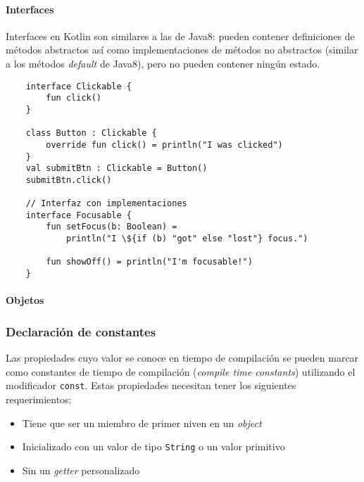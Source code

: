 \paragraph{Interfaces}
Interfaces en Kotlin son similares a las de Java8: pueden contener definiciones de métodos abstractos así como implementaciones de métodos no abstractos (similar a los métodos \emph{default} de Java8), pero no pueden contener ningún estado.
\begin{verbatim}
    interface Clickable {
        fun click()
    }
    
    class Button : Clickable {
        override fun click() = println("I was clicked")
    }
    val submitBtn : Clickable = Button()
    submitBtn.click() 
    
    // Interfaz con implementaciones
    interface Focusable {
        fun setFocus(b: Boolean) = 
            println("I \${if (b) "got" else "lost"} focus.")
            
        fun showOff() = println("I'm focusable!")            
    }
\end{verbatim}


\paragraph{Objetos}



%


\subsubsection{Declaración de constantes}
Las propiedades cuyo valor se conoce en tiempo de compilación se pueden marcar como constantes de tiempo de compilación (\emph{compile time constants}) utilizando el modificador \texttt{const}. Estas propiedades necesitan tener los siguientes requerimientos:
\begin{itemize}
    \item Tiene que ser un miembro de primer niven en un \emph{object}
    \item Inicializado con un valor de tipo \texttt{String} o un valor primitivo
    \item Sin un \emph{getter} personalizado
\end{itemize}

